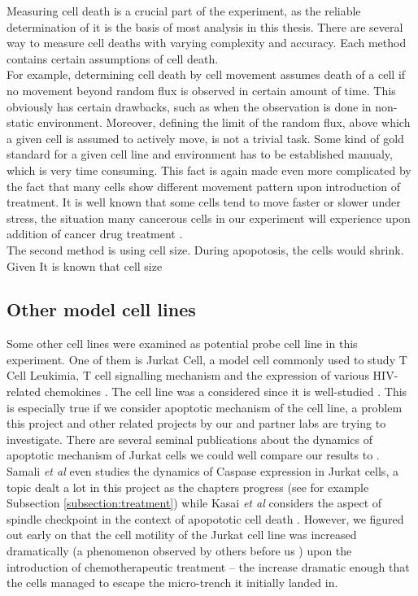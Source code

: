 \documentclass[pdftex,12pt,a4paper]{report}
\begin{document}

Measuring cell death is a crucial part of the experiment, as the reliable determination of it is the basis of most analysis in this thesis. There are several way to measure cell deaths with varying complexity and accuracy. Each method contains certain assumptions of cell death.\\

For example, determining cell death by cell movement assumes death of a cell if no movement beyond random flux is observed in certain amount of time. This obviously has certain drawbacks, such as when the observation is done in non-static environment. Moreover, defining the limit of the random flux, above which a given cell is assumed to actively move, is not a trivial task. Some kind of gold standard for a given cell line and environment has to be established manualy, which is very time consuming. This fact is again made even more complicated by the fact that many cells show different movement pattern upon introduction of treatment. It is well known that some cells tend to move faster or slower under stress, the situation many cancerous cells in our experiment will experience upon addition of cancer drug treatment \cite{pienta1991effects, fenteany2003small, ruocco2012suppressing}.\\

The second method is using cell size. During apopotosis, the cells would shrink. Given It is known that cell size %

\subsection{Other model cell lines}



Some other cell lines were examined as potential probe cell line in this experiment. One of them is Jurkat Cell, a model cell commonly used to study T Cell Leukimia, T cell signalling mechanism and the expression of various HIV-related chemokines \cite{schneider1977characterization}. The cell line was a considered since it is well-studied \cite{johnson2007genome, schena1996parallel}. This is especially true if we consider apoptotic mechanism of the cell line, a problem this project and other related projects by our  and partner labs are trying to investigate. There are several seminal publications about the dynamics of apoptotic mechanism of Jurkat cells we could well compare our results to \cite{gottlieb1996apoptosis}. Samali \textit{et al} \cite{samali1999presence} even studies the dynamics of Caspase expression in Jurkat cells, a topic dealt a lot in this project as the chapters progress (see for example Subsection \ref{subsection:treatment}) while Kasai \textit{et al} considers the aspect of spindle checkpoint in the context of apopototic cell death \cite{kasai2002prevalent}. However, we figured out early on that the cell motility of the Jurkat cell line was increased dramatically (a phenomenon observed by others before us \cite{barnhart2004cd95}) upon the introduction of chemotherapeutic treatment -- the increase dramatic enough that the cells managed to escape the micro-trench it initially landed in.
\end{document}

